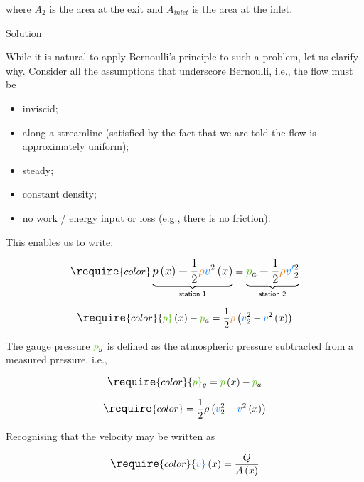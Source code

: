 \documentclass[
  1.2em,
  letterpaper,
  DIV=11,
  numbers=noendperiod]{scrartcl}
\providecommand{\tightlist}{%
  \setlength{\itemsep}{0pt}\setlength{\parskip}{0pt}}\usepackage{longtable,booktabs,array}
\begin{document}
where \(A_2\) is the area at the exit and \(A_{inlet}\) is the area at
the inlet.

Solution

While it is natural to apply Bernoulli's principle to such a problem,
let us clarify why. Consider all the assumptions that underscore
Bernoulli, i.e., the flow must be

\begin{itemize}
\tightlist
\item
  inviscid;
\item
  along a streamline (satisfied by the fact that we are told the flow is
  approximately uniform);
\item
  steady;
\item
  constant density;
\item
  no work / energy input or loss (e.g., there is no friction).
\end{itemize}

This enables us to write:

\[
\large
\require{color}
\underbrace{p\left(x\right) + \frac{1}{2}{\color[rgb]{0.918231,0.469102,0.038229}\rho} {\color[rgb]{0.059472,0.501943,0.998465}v}^2\left(x\right)}_{\textsf{station 1}} = \underbrace{{\color[rgb]{0.315209,0.728565,0.037706}p}_{a}  + \frac{1}{2}{\color[rgb]{0.918231,0.469102,0.038229}\rho}  {\color[rgb]{0.059472,0.501943,0.998465}v'}_{2}^2}_{\textsf{station 2}}
\]

\[
\large
\require{color}
{\color[rgb]{0.315209,0.728565,0.037706}p}\left(x\right) - {\color[rgb]{0.315209,0.728565,0.037706}p}_a = \frac{1}{2}{\color[rgb]{0.918231,0.469102,0.038229}\rho} \left( {\color[rgb]{0.059472,0.501943,0.998465}v}_2^2 - {\color[rgb]{0.059472,0.501943,0.998465}v}^2\left(x\right)\right)
\]

The gauge pressure \({\color[rgb]{0.315209,0.728565,0.037706}p}_{g}\) is
defined as the atmospheric pressure subtracted from a measured pressure,
i.e.,

\[
\large
\require{color}
{\color[rgb]{0.315209,0.728565,0.037706}p}_{g}  = {\color[rgb]{0.315209,0.728565,0.037706}p}\left( x \right) - {\color[rgb]{0.315209,0.728565,0.037706}p}_a
\]

\[
\large
\require{color}
= \frac{1}{2}\rho \left({\color[rgb]{0.059472,0.501943,0.998465}v}_2^2 - {\color[rgb]{0.059472,0.501943,0.998465}v}^2\left(x\right) \right) 
\]

Recognising that the velocity may be written as

\[
\large
\require{color}
{\color[rgb]{0.059472,0.501943,0.998465}v}\left(x\right) = \frac{Q}{A\left(x\right)}
\]
\end{document}
